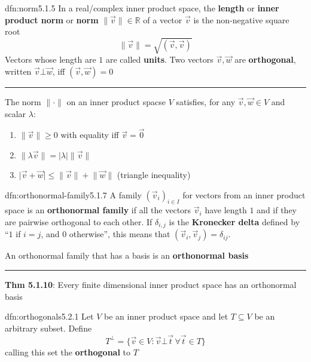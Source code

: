 \documentclass[landscape, 8pt]{extarticle}
\begin{document}
\begin{multicols}{3}
\begin{dfn}[Norm]{dfn:norm}{5.1.5}
    In a real/complex inner product space, the \textbf{length} or \textbf{inner product norm} or \textbf{norm} $\lVert \vec{v} \rVert\in \mathbb{R}$ of a vector $\vec{v}$ is the non-negative square root
    \[\lVert \vec{v} \rVert = \sqrt{(\vec{v}, \vec{v})}\]
    Vectors whose length are $1$ are called \textbf{units}. Two vectors $\vec{v}, \vec{w}$ are \textbf{orthogonal}, written $\vec{v} \bot \vec{w}$, iff $(\vec{v}, \vec{w}) = 0$

    \noindent\rule{\textwidth}{0.2pt}
    The norm $\lVert \cdot \rVert$ on an inner product spacse $V$ satisfies, for any $\vec{v}, \vec{w}\in V$ and scalar $\lambda$:
    \begin{enumerate}
        \setlength\itemsep{0em}
        \item $\lVert \vec{v} \rVert \ge 0$ with equality iff $\vec{v} = \vec{0}$
        \item $\lVert \lambda \vec{v} \rVert = \lvert \lambda \rvert \lVert  \vec{v} \rVert$
        \item $\lvert \vec{v} + \vec{w} \rvert \le \lVert \vec{v} \rVert + \lVert \vec{w} \rVert$ (triangle inequality)
    \end{enumerate}
\end{dfn}

\begin{dfn}{dfn:orthonormal-family}{5.1.7}
    A family $(\vec{v}_{i})_{i\in I}$ for vectors from an inner product space is an \textbf{orthonormal family} if all the vectors $\vec{v}_{i}$ have length $1$ and if they are pairwise orthogonal to each other. If $\delta_{i,j}$ is the \textbf{Kronecker delta} defined by ``$1$ if $i = j$, and $0$ otherwise'', this means that $(\vec{v}_{i}, \vec{v}_{j}) = \delta_{ij}$.

    An orthonormal family that has a basis is an \textbf{orthonormal basis}
    
    \noindent\rule{\textwidth}{0.2pt}
    \textbf{Thm 5.1.10}: Every finite dimensional inner product space has an orthonormal basis
\end{dfn}

\begin{dfn}{dfn:orthogonals}{5.2.1}
    Let $V$ be an inner product space and let $T \subseteq V$ be an arbitrary subset. Define
    \[T^{\bot} = \{\vec{v} \in V : \vec{v} \bot \vec{t} \, \forall \vec{t}\in T\}\]
    calling this set the \textbf{orthogonal} to $T$
\end{dfn}


\end{multicols}
\end{document}
